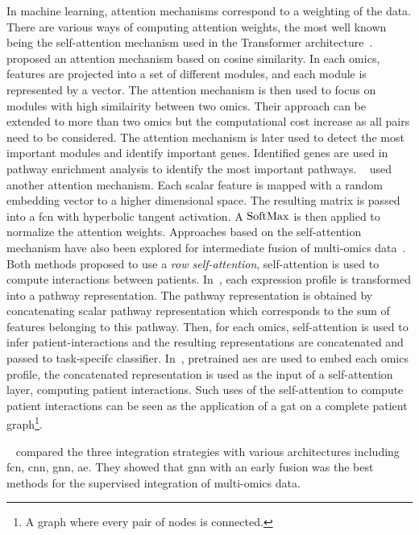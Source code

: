 \documentclass[../main.tex]{subfiles}
\begin{document}
		In machine learning, attention mechanisms correspond to a weighting of the data.
		There are various ways of computing attention weights, the most well known being the self-attention mechanism used in the Transformer architecture~\cite{AttentionAllYouNeed}.
		\citeauthor{MOMA}~\cite{MOMA} proposed an attention mechanism based on cosine similarity.
		In each omics, features are projected into a set of different modules, and each module is represented by a vector.
		The attention mechanism is then used to focus on modules with high similairity between two omics.
		Their approach can be extended to more than two omics but the computational cost increase as all pairs need to be considered.
		The attention mechanism is later used to detect the most important modules and identify important genes.
		Identified genes are used in pathway enrichment analysis to identify the most important pathways.
		\citeauthor{moBRCA}~\cite{moBRCA} used another attention mechanism.
		Each scalar feature is mapped with a random embedding vector to a higher dimensional space.
		The resulting matrix is passed into a \gls{fcn} with hyperbolic tangent activation.
		A \(\operatorname{SoftMax}\) is then applied to normalize the attention weights.
		Approaches based on the self-attention mechanism have also been explored for intermediate fusion of multi-omics data~\cite{Yao_2024,Lan2024}.
		Both methods proposed to use a \emph{row self-attention}, self-attention is used to compute interactions between patients.
		In~\cite{Lan2024}, each expression profile is transformed into a pathway representation.
		The pathway representation is obtained by concatenating scalar pathway representation which corresponds to the sum of features belonging to this pathway.
		Then, for each omics, self-attention is used to infer patient-interactions and the resulting representations are concatenated and passed to task-specifc classifier.
		In~\cite{Yao_2024}, pretrained \glspl{ae} are used to embed each omics profile, the concatenated representation is used as the input of a self-attention layer, computing patient interactions.
		Such uses of the self-attention to compute patient interactions can be seen as the application of a \gls{gat} on a complete patient graph\footnote{A graph where every pair of nodes is connected.}.

		\ifSubfilesClassLoaded{%
		}{
		}

		\citeauthor{Leng2022}~\cite{Leng2022} compared the three integration strategies with various architectures including \gls{fcn}, \gls{cnn}, \gls{gnn}, \gls{ae}.
		They showed that \gls{gnn} with an early fusion was the best methods for the supervised integration of multi-omics data.
\end{document}
